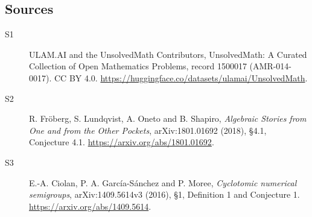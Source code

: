 \documentclass[11pt]{article}
\begin{document}
\subsection{Sources}
\begin{description}
\item[\hypertarget{source:1500017:1}{S1}] ULAM.AI and the UnsolvedMath Contributors, UnsolvedMath: A Curated Collection of Open Mathematics Problems, record 1500017 (AMR-014-0017). CC BY 4.0. \url{https://huggingface.co/datasets/ulamai/UnsolvedMath}.
\item[\hypertarget{source:1500017:2}{S2}] R. Fröberg, S. Lundqvist, A. Oneto and B. Shapiro, \emph{Algebraic Stories from One and from the Other Pockets}, arXiv:1801.01692 (2018), §4.1, Conjecture 4.1. \url{https://arxiv.org/abs/1801.01692}.
\item[\hypertarget{source:1500017:3}{S3}] E.-A. Ciolan, P. A. García-Sánchez and P. Moree, \emph{Cyclotomic numerical semigroups}, arXiv:1409.5614v3 (2016), §1, Definition 1 and Conjecture 1. \url{https://arxiv.org/abs/1409.5614}.
\end{description}
\label{end:1500017}
\end{document}
